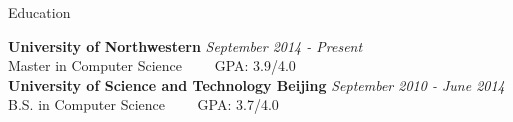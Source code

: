 \documentclass{resume} %
\begin{document}

\begin{rSection}{Education}

{\bf University of Northwestern} \hfill {\em September 2014 - Present} \\ 
Master in Computer Science~~~~
GPA: 3.9/4.0\\
{\bf University of Science and Technology Beijing} \hfill {\em September 2010 - June 2014} \\ 
B.S. in Computer Science~~~~
GPA: 3.7/4.0
\end{rSection}

\end{document}

